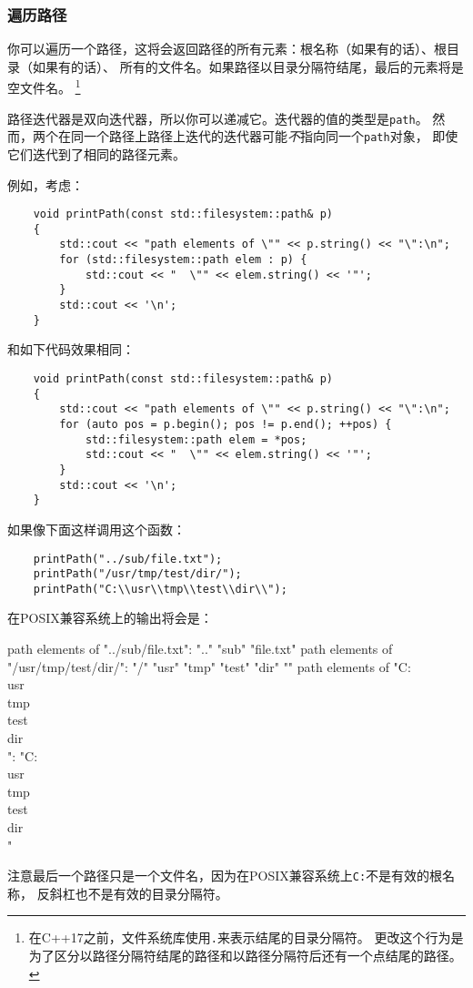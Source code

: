 \subsubsection{遍历路径}
你可以遍历一个路径，这将会返回路径的所有元素：根名称（如果有的话）、根目录（如果有的话）、
所有的文件名。如果路径以目录分隔符结尾，最后的元素将是空文件名。
\footnote{在C++17之前，文件系统库使用\texttt{.}来表示结尾的目录分隔符。
更改这个行为是为了区分以路径分隔符结尾的路径和以路径分隔符后还有一个点结尾的路径。}

路径迭代器是双向迭代器，所以你可以递减它。迭代器的值的类型是\texttt{path}。
然而，两个在同一个路径上路径上迭代的迭代器可能\emph{不}指向同一个\texttt{path}对象，
即使它们迭代到了相同的路径元素。

例如，考虑：
\begin{lstlisting}
    void printPath(const std::filesystem::path& p)
    {
        std::cout << "path elements of \"" << p.string() << "\":\n";
        for (std::filesystem::path elem : p) {
            std::cout << "  \"" << elem.string() << '"';
        }
        std::cout << '\n';
    }
\end{lstlisting}
和如下代码效果相同：
\begin{lstlisting}
    void printPath(const std::filesystem::path& p)
    {
        std::cout << "path elements of \"" << p.string() << "\":\n";
        for (auto pos = p.begin(); pos != p.end(); ++pos) {
            std::filesystem::path elem = *pos;
            std::cout << "  \"" << elem.string() << '"';
        }
        std::cout << '\n';
    }
\end{lstlisting}
如果像下面这样调用这个函数：
\begin{lstlisting}
    printPath("../sub/file.txt");
    printPath("/usr/tmp/test/dir/");
    printPath("C:\\usr\\tmp\\test\\dir\\");
\end{lstlisting}
在POSIX兼容系统上的输出将会是：
\begin{blacklisting}
    path elements of "../sub/file.txt":
      ".."  "sub"  "file.txt"
    path elements of "/usr/tmp/test/dir/":
      "/"  "usr"  "tmp"  "test"  "dir"  ""
    path elements of "C:\\usr\\tmp\\test\\dir\\":
      "C:\\usr\\tmp\\test\\dir\\"
\end{blacklisting}
注意最后一个路径只是一个文件名，因为在POSIX兼容系统上\texttt{C:}不是有效的根名称，
反斜杠也不是有效的目录分隔符。

